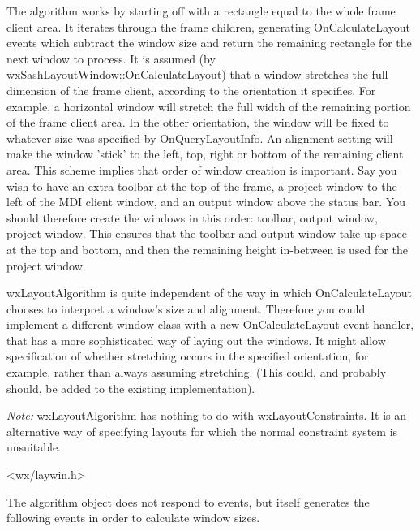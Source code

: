 The algorithm works by starting off with a rectangle equal to the whole frame client area.
It iterates through the frame children, generating OnCalculateLayout events which subtract
the window size and return the remaining rectangle for the next window to process. It
is assumed (by wxSashLayoutWindow::OnCalculateLayout) that a window stretches the full dimension
of the frame client, according to the orientation it specifies. For example, a horizontal window
will stretch the full width of the remaining portion of the frame client area.
In the other orientation, the window will be fixed to whatever size was specified by
OnQueryLayoutInfo. An alignment setting will make the window 'stick' to the left, top, right or
bottom of the remaining client area. This scheme implies that order of window creation is important.
Say you wish to have an extra toolbar at the top of the frame, a project window to the left of
the MDI client window, and an output window above the status bar. You should therefore create
the windows in this order: toolbar, output window, project window. This ensures that the toolbar and
output window take up space at the top and bottom, and then the remaining height in-between is used for
the project window.

wxLayoutAlgorithm is quite independent of the way in which
OnCalculateLayout chooses to interpret a window's size and alignment. Therefore you
could implement a different window class with a new OnCalculateLayout event handler,
that has a more sophisticated way of laying out the windows. It might allow
specification of whether stretching occurs in the specified orientation, for example,
rather than always assuming stretching. (This could, and probably should, be added to the existing
implementation).

{\it Note:} wxLayoutAlgorithm has nothing to do with wxLayoutConstraints. It is an alternative
way of specifying layouts for which the normal constraint system is unsuitable.




<wx/laywin.h>




The algorithm object does not respond to events, but itself generates the
following events in order to calculate window sizes.

